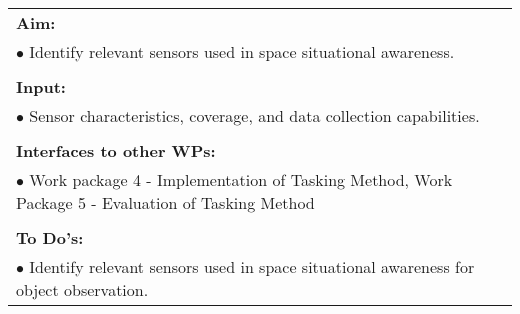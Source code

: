 \begin{table}[!h]
\begin{center}
\begin{tabular}{|p{35mm}||p{55mm}|p{50mm}||p{40mm}|}
      \hline\hline
      \multicolumn{4}{|p{150mm}|}{\textbf{Aim:}}                                                                                                                                                            \\
      \multicolumn{4}{|p{150mm}|}{$\bullet$ Identify relevant sensors used in space situational awareness.}                                                   \\
      \multicolumn{4}{|p{150mm}|}{}                                                                                                                                                                           \\
      \multicolumn{4}{|p{150mm}|}{\textbf{Input:}}                                                                                                                                                            \\
      \multicolumn{4}{|p{150mm}|}{$\bullet$ Sensor characteristics, coverage, and data collection capabilities.}                                                                                                                                 \\
      \multicolumn{4}{|p{150mm}|}{}                                                                                                                                                                           \\
      \multicolumn{4}{|p{150mm}|}{\textbf{Interfaces to other WPs:}}                                                                                                                                    \\
      \multicolumn{4}{|p{150mm}|}{$\bullet$ Work package 4 - Implementation of Tasking Method, Work Package 5 - Evaluation of Tasking Method}                                                                                              \\
      \multicolumn{4}{|p{150mm}|}{}                                                                                                                                                                           \\
      \multicolumn{4}{|p{150mm}|}{\textbf{To Do's:}}                                                                                                                                                         \\
      \multicolumn{4}{|p{150mm}|}{$\bullet$ Identify relevant sensors used in space situational awareness for object observation.}\\

\end{tabular}
\end{center}
\end{table}
